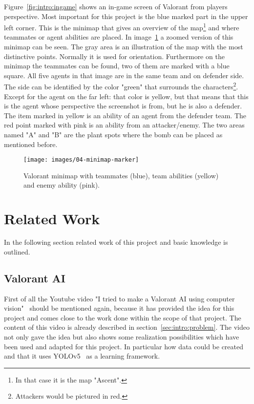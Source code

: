 Figure~\ref{fig:intro:ingame} shows an in-game screen of Valorant from players perspective. Most 
important for this project is the blue marked part in the upper left corner. This is the minimap that 
gives an overview of the map\footnote{In that case it is the map "Ascent".} and where teammates or 
agent abilities are placed. In image~\ref{fig:intro:minimap} a zoomed version of this minimap can be 
seen. The gray area is an illustration of the map with the most distinctive points. Normally it is used 
for orientation. Furthermore on the minimap the teammates can be found, two of them are marked 
with a blue square. All five agents in that image are in the same team and on defender side. The side 
can be identified by the color "green" that surrounds the characters\footnote{Attackers would be 
pictured in red.}.  Except for the agent on the far left: that color is yellow, but that means that this is 
the agent whose perspective the screenshot is from, but he is also a defender. The item marked in 
yellow is an ability of an agent from the defender team. The red point marked with pink is an ability 
from an attacker/enemy. The two areas named "A" and "B" are the plant spots where the bomb can 
be placed as mentioned before.

\begin{figure}
	\centering
	\texttt{[image: images/04-minimap-marker]}
	\caption[Valorant minimap]{Valorant minimap with teammates (blue), team abilities (yellow) and 
	enemy ability (pink).}
	\label{fig:intro:minimap}
\end{figure}


\section{Related Work}\label{sec:intro:relatedWork}

In the following section related work of this project and basic knowledge is outlined.

\subsection[Video: Valorant AI]{Valorant AI}\label{subsec:intro:video}

First of all the Youtube video "I tried to make a Valorant AI using computer vision"~\cite{river2021} 
should be mentioned again, because it has provided the idea for this project and comes close to 
the work done within the scope of that project. The content of this video is already described in 
section~\ref{sec:intro:problem}. The video not only gave the idea but also shows some realization 
possibilities which have been used and adapted for this project. In particular how data could be 
created and that it uses YOLOv5~\cite{jocher2020} as a learning framework.

